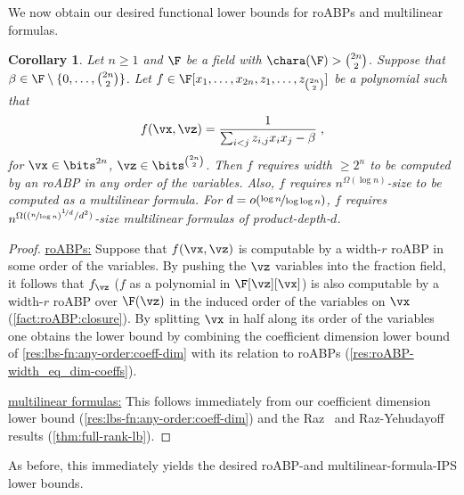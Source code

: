 \documentclass[11pt]{article}
\numberwithin{equation}{section}
\newtheorem{corollary}[theorem]{Corollary}
\theoremstyle{definition}
\theoremstyle{plain}
\begin{document}
We now obtain our desired functional lower bounds for roABPs and multilinear formulas.

\begin{corollary}\label{res:lbs-fn:any-order}
        Let $n\ge 1$ and $\F$ be a field with $\chara(\F)>\binom{2n}{2}$.  Suppose that $\beta\in\F\setminus\{0,\ldots,\binom{2n}{2}\}$.  Let $f\in\F[x_1,\ldots,x_{2n},z_1,\ldots,z_{\binom{2n}{2}}]$ be a polynomial such that
        \[
                f(\vx,\vz)=\frac{1}{\sum_{i<j} z_{i,j}x_ix_j-\beta}
                \;,
        \]
        for $\vx\in\bits^{2n}$, $\vz\in\bits^{\binom{2n}{2}}$. Then $f$ requires width $\ge 2^n$ to be computed by an roABP in any order of the variables.  Also, $f$ requires $n^{\Omega(\log n)}$-size to be computed as a multilinear formula.  For $d=o(\nicefrac{\log n}{\log\log n})$, $f$ requires $n^{\Omega((\nicefrac{n}{\log n})^{\nicefrac{1}{d}}/d^2)}$-size multilinear formulas of product-depth-$d$.
\end{corollary}
\begin{proof}
        \uline{roABPs:}  Suppose that $f(\vx,\vz)$ is computable by a width-$r$ roABP in some order of the variables.  By pushing the $\vz$ variables into the fraction field, it follows that $f_\vz$ ($f$ as a polynomial in $\F[\vz][\vx]$) is also computable by a width-$r$ roABP over $\F(\vz)$ in the induced order of the variables on $\vx$ (\autoref{fact:roABP:closure}).  By splitting $\vx$ in half along its order of the variables one obtains the lower bound by combining the coefficient dimension lower bound of \autoref{res:lbs-fn:any-order:coeff-dim} with its relation to roABPs (\autoref{res:roABP-width_eq_dim-coeffs}).

        \uline{multilinear formulas:} This follows immediately from our coefficient dimension lower bound (\autoref{res:lbs-fn:any-order:coeff-dim}) and the Raz~\cite{Raz09} and Raz-Yehudayoff~\cite{RazYehudayoff09} results (\autoref{thm:full-rank-lb}).
\end{proof}

As before, this immediately yields the desired roABP-\lIPS and multilinear-formula-IPS lower bounds.
\end{document}
